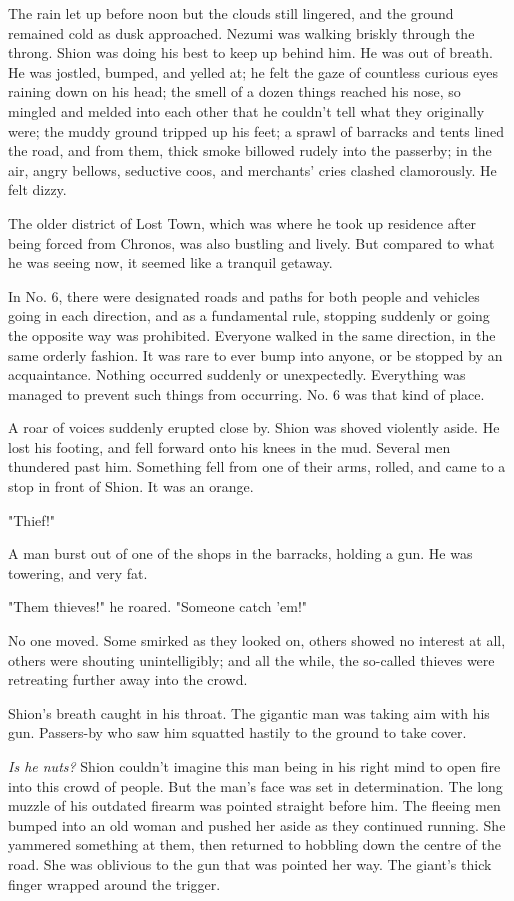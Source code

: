 \mybreak

The rain let up before noon but the clouds still lingered, and the
ground remained cold as dusk approached. Nezumi was walking briskly
through the throng. Shion was doing his best to keep up behind him. He
was out of breath. He was jostled, bumped, and yelled at; he felt the
gaze of countless curious eyes raining down on his head; the smell of a
dozen things reached his nose, so mingled and melded into each other
that he couldn't tell what they originally were; the muddy ground
tripped up his feet; a sprawl of barracks and tents lined the road, and
from them, thick smoke billowed rudely into the passerby; in the air,
angry bellows, seductive coos, and merchants' cries clashed clamorously.
He felt dizzy.

The older district of Lost Town, which was where he took up residence
after being forced from Chronos, was also bustling and lively. But
compared to what he was seeing now, it seemed like a tranquil getaway.

In No. 6, there were designated roads and paths for both people and
vehicles going in each direction, and as a fundamental rule, stopping
suddenly or going the opposite way was prohibited. Everyone walked in
the same direction, in the same orderly fashion. It was rare to ever
bump into anyone, or be stopped by an acquaintance. Nothing occurred
suddenly or unexpectedly. Everything was managed to prevent such things
from occurring. No. 6 was that kind of place.

A roar of voices suddenly erupted close by. Shion was shoved violently
aside. He lost his footing, and fell forward onto his knees in the mud.
Several men thundered past him. Something fell from one of their arms,
rolled, and came to a stop in front of Shion. It was an orange.

"Thief!"

A man burst out of one of the shops in the barracks, holding a gun. He
was towering, and very fat.

"Them thieves!" he roared. "Someone catch 'em!"

No one moved. Some smirked as they looked on, others showed no interest
at all, others were shouting unintelligibly; and all the while, the
so-called thieves were retreating further away into the crowd.

Shion's breath caught in his throat. The gigantic man was taking aim
with his gun. Passers-by who saw him squatted hastily to the ground to
take cover.

\emph{Is he nuts?} Shion couldn't imagine this man being in his right mind to
open fire into this crowd of people. But the man's face was set in
determination. The long muzzle of his outdated firearm was pointed
straight before him. The fleeing men bumped into an old woman and pushed
her aside as they continued running. She yammered something at them,
then returned to hobbling down the centre of the road. She was oblivious
to the gun that was pointed her way. The giant's thick finger wrapped
around the trigger.

